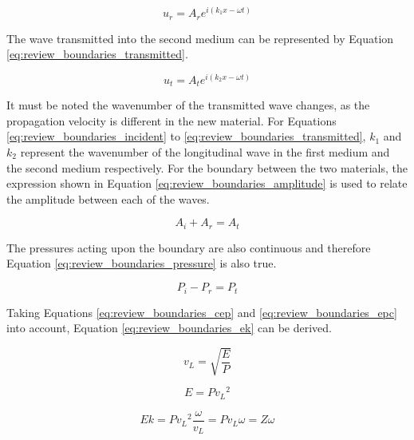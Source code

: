 \begin{equation} \label{eq:review_boundaries_reflected}
u_{r} = A_{r}e^{i(k_{1}x - \omega t)}
\end{equation}

The wave transmitted into the second medium can be represented by Equation \ref{eq:review_boundaries_transmitted}.

\begin{equation} \label{eq:review_boundaries_transmitted}
u_{t} = A_{t}e^{i(k_{2}x - \omega t)}
\end{equation}

It must be noted the wavenumber of the transmitted wave changes, as the propagation velocity is different in the new material. For Equations \ref{eq:review_boundaries_incident} to \ref{eq:review_boundaries_transmitted}, $k_{1}$ and $k_{2}$ represent the wavenumber of the longitudinal wave in the first medium and the second medium respectively. For the boundary between the two materials, the expression shown in Equation \ref{eq:review_boundaries_amplitude} is used to relate the amplitude between each of the waves.

\begin{equation} \label{eq:review_boundaries_amplitude}
A_{i} + A_{r} = A_{t} 
\end{equation}

The pressures acting upon the boundary are also continuous and therefore Equation \ref{eq:review_boundaries_pressure} is also true.

\begin{equation} \label{eq:review_boundaries_pressure}
P_{i} - P_{r} = P_{t} 
\end{equation}

Taking Equations \ref{eq:review_boundaries_cep} and \ref{eq:review_boundaries_epc} into account, Equation \ref{eq:review_boundaries_ek} can be derived.

\begin{equation} \label{eq:review_boundaries_cep}
v_L = \sqrt{\frac{E}{P}}
\end{equation}

\begin{equation} \label{eq:review_boundaries_epc}
E = P{v_L}^2
\end{equation}

\begin{equation} \label{eq:review_boundaries_ek}
Ek = P{v_L}^2 \frac{\omega}{{v_L}} = P{v_L}\omega = Z\omega
\end{equation}

